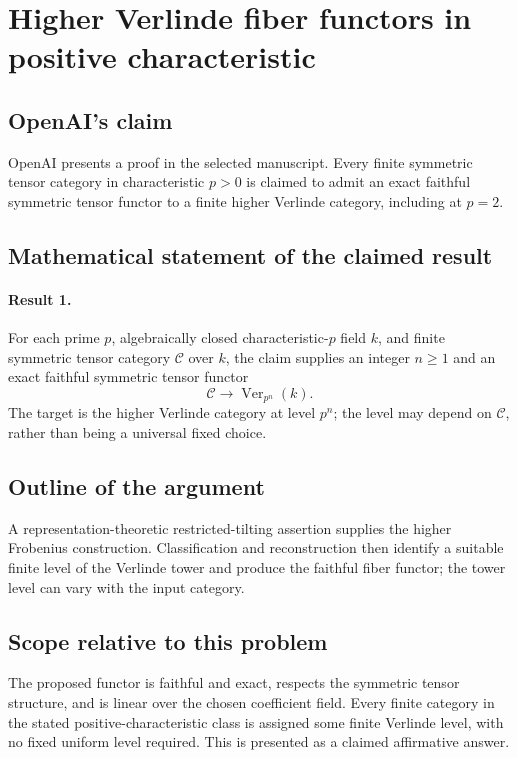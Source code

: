 \documentclass[11pt]{article}
\begin{document}
\section*{Higher Verlinde fiber functors in positive characteristic}

\subsection{OpenAI's claim}
OpenAI presents a proof in the selected manuscript. Every finite symmetric tensor category in characteristic $p>0$ is claimed to admit an exact faithful symmetric tensor functor to a finite higher Verlinde category, including at $p=2$.

\subsection{Mathematical statement of the claimed result}
\paragraph{Result 1.} For each prime \(p\), algebraically closed characteristic-\(p\) field \(k\), and finite symmetric tensor category \(\mathcal C\) over \(k\), the claim supplies an integer \(n\ge1\) and an exact faithful symmetric tensor functor
\[
 \mathcal C\longrightarrow\operatorname{Ver}_{p^n}(k).
\]
The target is the higher Verlinde category at level \(p^n\); the level may depend on \(\mathcal C\), rather than being a universal fixed choice.

\subsection{Outline of the argument}
A representation-theoretic restricted-tilting assertion supplies the higher Frobenius construction. Classification and reconstruction then identify a suitable finite level of the Verlinde tower and produce the faithful fiber functor; the tower level can vary with the input category.

\subsection{Scope relative to this problem}
The proposed functor is faithful and exact, respects the symmetric tensor structure, and is linear over the chosen coefficient field. Every finite category in the stated positive-characteristic class is assigned some finite Verlinde level, with no fixed uniform level required. This is presented as a claimed affirmative answer.
\end{document}

